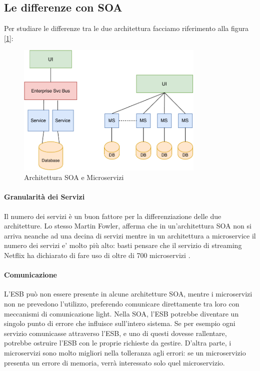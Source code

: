 \subsection{Le differenze con SOA}
Per studiare le differenze tra le due architettura facciamo riferimento alla figura [\ref{fig:soavsmicroservices}]:
\begin{figure}[H]
    \centering
    \includegraphics[width=0.80\textwidth]{images/01_8_microservices_vs_soa.pdf}
    \caption{Architettura SOA e Microservizi }
    \label{fig:soavsmicroservices}
\end{figure}
\paragraph*{Granularità dei Servizi} Il numero dei servizi è un buon fattore per la differenziazione delle due architetture. Lo stesso Martin Fowler, afferma che in un'architettura SOA non si arriva neanche ad una decina di  servizi mentre in un architettura a microservice il numero dei servizi e’ molto più alto: basti pensare che il servizio di streaming Netflix ha dichiarato di fare uso di oltre di 700 microservizi \cite{article:netflixmicroservices}.

\paragraph{Comunicazione} L'ESB può non essere presente in alcune architetture SOA, mentre i microservizi non ne prevedono l’utilizzo, preferendo comunicare direttamente tra loro con meccanismi di comunicazione light. Nella SOA, l’ESB potrebbe diventare un singolo punto di errore che influisce sull’intero sistema. Se per esempio ogni servizio comunicasse attraverso l’ESB, e uno di questi dovesse rallentare, potrebbe ostruire l’ESB con le proprie richieste da gestire. D’altra parte, i microservizi sono molto migliori nella tolleranza agli errori: se un microservizio presenta un errore di memoria, verrà interessato solo quel microservizio.

